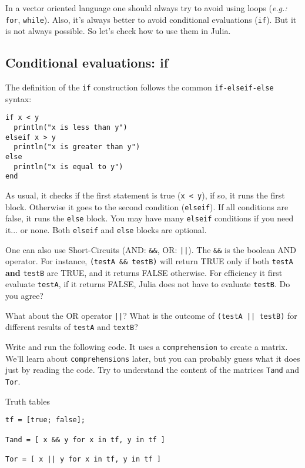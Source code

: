 In a vector oriented language one should always try to avoid using loops (\textit{e.g.:} \texttt{for}, \texttt{while}). Also, it's always better to avoid conditional evaluations (\texttt{if}). But it is not always possible. So let's check how to use them in Julia.

\subsection{Conditional evaluations: if}

The definition of the \texttt{if} construction follows the common \texttt{if-elseif-else} syntax:

\begin{verbatim}
if x < y
  println("x is less than y")
elseif x > y
  println("x is greater than y")
else
  println("x is equal to y")
end
\end{verbatim}

As usual, it checks if the first statement is true (\texttt{x < y}), if so, it runs the first block. Otherwise it goes to the second condition (\texttt{elseif}). If all conditions are false, it runs the \texttt{else} block. You may have many \texttt{elseif} conditions if you need it... or none. Both \texttt{elseif} and \texttt{else} blocks are optional.

One can also use Short-Circuits (AND: \texttt{\&\&}, OR: \texttt{||}). The \texttt{\&\&} is the boolean AND operator. For instance, \texttt{(testA \&\& testB)} will return TRUE only if both \texttt{testA} \textbf{and} \texttt{testB} are TRUE, and it returns FALSE otherwise. For efficiency it first evaluate \texttt{testA}, if it returns FALSE, Julia does not have to evaluate \texttt{testB}. Do you agree?

What about the OR operator \texttt{||}? What is the outcome of \texttt{(testA || testB)} for different results of \texttt{testA} and \texttt{textB}?

Write and run the following code. It uses a \texttt{comprehension} to create a matrix. We'll learn about \texttt{comprehensions} later, but you can probably guess what it does just by reading the code. Try to understand the content of the matrices \texttt{Tand} and \texttt{Tor}.

\begin{example}{Truth tables}
\label{ex:truthtable}
\begin{verbatim}
tf = [true; false];

Tand = [ x && y for x in tf, y in tf ]

Tor = [ x || y for x in tf, y in tf ]
\end{verbatim}
\end{example}

